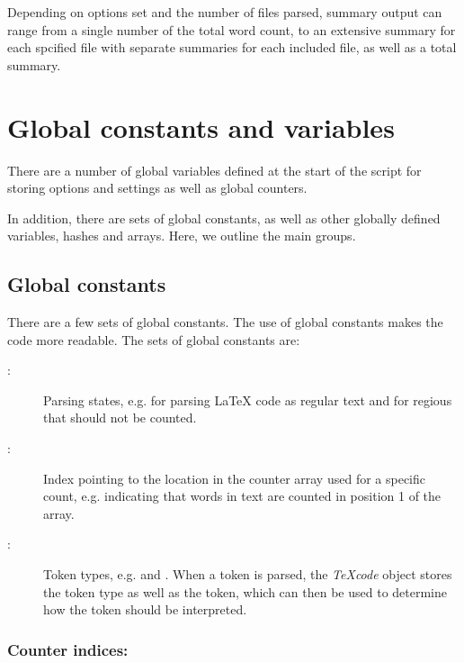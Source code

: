 \documentclass{article}
\newcommand\Obj[1]{\textsl{#1}}
\newcommand\wild{\ldots}
\begin{document}
Depending on options set and the number of files parsed, summary output can range from a single number of the total word count, to an extensive summary for each spcified file with separate summaries for each included file, as well as a total summary.



\section{Global constants and variables}

There are a number of global variables defined at the start of the script for storing options and settings as well as global counters.

In addition, there are sets of global constants, as well as other globally defined variables, hashes and arrays. Here, we outline the main groups.


\subsection{Global constants}

There are a few sets of global constants. The use of global constants makes the code more readable. The sets of global constants are:

\begin{description}

\item[\code{\$STATE_\wild}:] Parsing states, e.g.  for parsing \LaTeX{} code as regular text and  for regious that should not be counted.

\item[\code{\$CNT_\wild}:] Index pointing to the location in the counter array used for a specific count, e.g.  indicating that words in text are counted in position 1 of the array.

\item[\code{\$TOKEN_\wild}:] Token types, e.g.  and . When a token is parsed, the \Obj{TeXcode} object stores the token type as well as the token, which can then be used to determine how the token should be interpreted.

\end{description}

\subsubsection{Counter indices: \code{\$CNT_\wild}}
\end{document}
